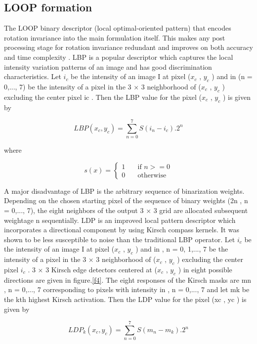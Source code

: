 \documentclass[conference]{IEEEtran}
\begin{document}
\subsection{LOOP formation}
The LOOP binary descriptor (local optimal-oriented pattern) that encodes rotation invariance into the main formulation itself. This makes any post processing stage for rotation invariance redundant and improves on both accuracy and time complexity \cite{b11}\cite{b12}. LBP is a popular descriptor which captures the local intensity variation patterns of an image and has good discrimination characteristics. Let $i_c$ be the intensity of an image I at pixel ($x_c$ , $y_c$ ) and in (n = 0,..., 7) be the intensity of a pixel in the 3 × 3 neighborhood of ($x_c$ , $y_c$ ) excluding the center pixel ic . Then the LBP value for the pixel ($x_c$ , $y_c$ ) is given by

\begin{equation}
\label{eq1}
LBP (x_c , y_c ) = \sum\limits_{n=0}^{7} S(i_n - i_c).2^{n}
\end{equation}

where

\[ s(x) =
  \begin{cases}
    1       & \quad \text{if } n>=0\\
    0  & \quad \text{otherwise}
  \end{cases}
\]

A major disadvantage of LBP is the arbitrary sequence of binarization weights. Depending on the chosen starting pixel of the sequence of binary weights (2n , n = 0,..., 7), the eight neighbors of the output 3 × 3 grid are allocated subsequent weightage n sequentially. LDP is an improved local pattern descriptor which incorporates a directional component by using Kirsch compass kernels. It was shown to be less susceptible to noise than the traditional LBP operator. Let $i_c$ be the intensity of an image I at pixel ($x_c$ , $y_c$ ) and in , n = 0, 1,..., 7 be the intensity of a pixel in the 3 × 3 neighborhood of ($x_c$ , $y_c$ ) excluding the center pixel $i_c$ . 3 × 3 Kirsch edge detectors centered at ($x_c$ , $y_c$ ) in eight possible directions are given in figure.\ref{f4}. The eight responses of the Kirsch masks are mn , n = 0,..., 7 corresponding to pixels with intensity in , n = 0,..., 7 and let mk be the kth highest Kirsch activation. Then the LDP value for the pixel (xc , yc ) is given by

\begin{equation}
\label{eq2}
LDP_k (x_c , y_c ) = \sum\limits_{n=0}^{7} S(m_n - m_k).2^{n}
\end{equation}
\end{document}
